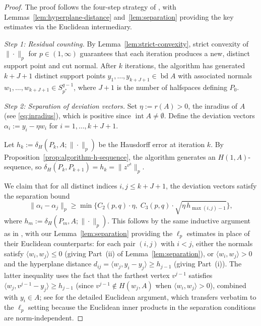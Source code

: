 \documentclass[11pt]{article}
\newcommand{\pstar}{p^*}
\begin{document}
\begin{proof}
The proof follows the four-step strategy of \cite[Theorem~7.2]{Ararat2024}, with Lemmas~\ref{lem:hyperplane-distance} and~\ref{lem:separation} providing the key estimates via the Euclidean intermediary.

\medskip
\noindent\emph{Step 1: Residual counting.}
By Lemma~\ref{lem:strict-convexity}, strict convexity of $\|\cdot\|_p$ for $p \in (1,\infty)$ guarantees that each iteration produces a new, distinct support point and cut normal. After $k$ iterations, the algorithm has generated $k + J + 1$ distinct support points $y_1, \ldots, y_{k+J+1} \in \operatorname{bd} A$ with associated normals $w_1, \ldots, w_{k+J+1} \in S_{\pstar}^{q-1}$, where $J+1$ is the number of halfspaces defining $P_0$.

\medskip
\noindent\emph{Step 2: Separation of deviation vectors.}
Set $\eta := r(A) > 0$, the inradius of $A$ (see \eqref{eq:inradius}), which is positive since $\operatorname{int} A \neq \emptyset$. Define the deviation vectors $\alpha_i := y_i - \eta w_i$ for $i = 1, \ldots, k + J + 1$.

Let $h_k := \delta_H(P_k, A; \|\cdot\|_p)$ be the Hausdorff error at iteration $k$. By Proposition~\ref{prop:algorithm-h-sequence}, the algorithm generates an $H(1,A)$-sequence, so $\delta_H(P_k, P_{k+1}) = h_k = \|z^{v^k}\|_p$.

We claim that for all distinct indices $i, j \le k + J + 1$, the deviation vectors satisfy the separation bound
\begin{equation}\label{eq:separation-claim}
\|\alpha_i - \alpha_j\|_p \ge \min\bigl\{C_2(p,q) \cdot \eta,\; C_3(p,q) \cdot \sqrt{\eta \, h_{\max(i,j)-1}}\bigr\},
\end{equation}
where $h_m := \delta_H(P_m, A; \|\cdot\|_p)$. This follows by the same inductive argument as in \cite[Lemma~7.9]{Ararat2024}, with our Lemma~\ref{lem:separation} providing the $\ell_p$ estimates in place of their Euclidean counterparts: for each pair $(i,j)$ with $i < j$, either the normals satisfy $\langle w_i, w_j \rangle \le 0$ (giving Part~(ii) of Lemma~\ref{lem:separation}), or $\langle w_i, w_j \rangle > 0$ and the hyperplane distance $d_{ij} = \langle w_j, y_i - y_j \rangle \ge h_{j-1}$ (giving Part~(i)). The latter inequality uses the fact that the farthest vertex $v^{j-1}$ satisfies $\langle w_j, v^{j-1} - y_j \rangle \ge h_{j-1}$ (since $v^{j-1} \notin H(w_j, A)$ when $\langle w_i, w_j \rangle > 0$), combined with $y_i \in A$; see \cite[pp.~21--22]{Ararat2024} for the detailed Euclidean argument, which transfers verbatim to the $\ell_p$ setting because the Euclidean inner products in the separation conditions are norm-independent.


\end{proof}
\end{document}
